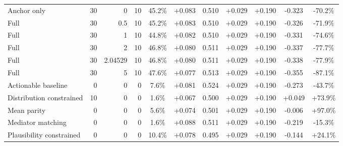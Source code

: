 \begin{table}[htbp]
\begin{tabular}{lrrrccccccc}
Anchor only & 30 & 0 & 10 & 45.2\% & +0.083 & 0.510 & +0.029 & +0.190 & -0.323 & -70.2\% \\
Full & 30 & 0.5 & 10 & 45.2\% & +0.083 & 0.510 & +0.029 & +0.190 & -0.326 & -71.9\% \\
Full & 30 & 1 & 10 & 44.8\% & +0.082 & 0.510 & +0.029 & +0.190 & -0.331 & -74.6\% \\
Full & 30 & 2 & 10 & 46.8\% & +0.080 & 0.511 & +0.029 & +0.190 & -0.337 & -77.7\% \\
Full & 30 & 2.04529 & 10 & 46.8\% & +0.080 & 0.511 & +0.029 & +0.190 & -0.338 & -77.9\% \\
Full & 30 & 5 & 10 & 47.6\% & +0.077 & 0.513 & +0.029 & +0.190 & -0.355 & -87.1\% \\
Actionable baseline & 0 & 0 & 0 & 7.6\% & +0.081 & 0.524 & +0.029 & +0.190 & -0.273 & -43.7\% \\
Distribution constrained & 10 & 0 & 0 & 1.6\% & +0.067 & 0.500 & +0.029 & +0.190 & +0.049 & +73.9\% \\
Mean parity & 0 & 0 & 0 & 5.6\% & +0.074 & 0.501 & +0.029 & +0.190 & -0.006 & +97.0\% \\
Mediator matching & 0 & 0 & 0 & 1.6\% & +0.088 & 0.511 & +0.029 & +0.190 & -0.219 & -15.3\% \\
Plausibility constrained & 0 & 0 & 0 & 10.4\% & +0.078 & 0.495 & +0.029 & +0.190 & -0.144 & +24.1\% \\
\bottomrule
\end{tabular}
\end{table}